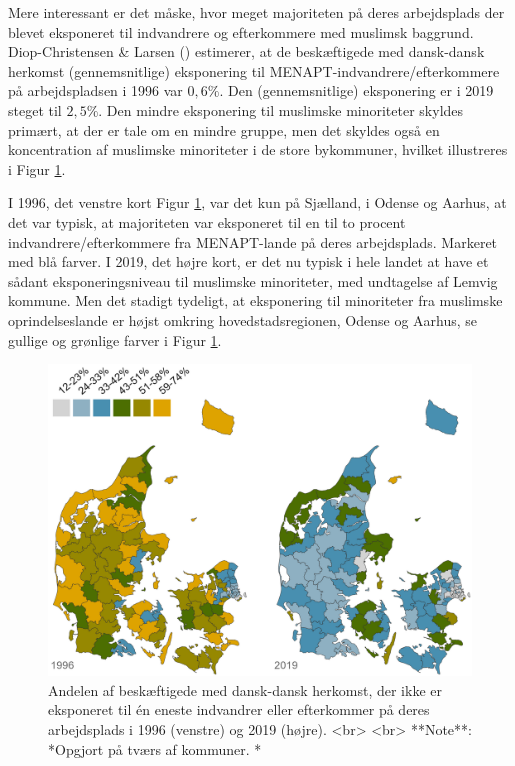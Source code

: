 \documentclass[
]{book}
\begin{document}
Mere interessant er det måske, hvor meget majoriteten på deres arbejdsplads der blevet eksponeret til indvandrere og efterkommere med muslimsk baggrund. Diop-Christensen \& Larsen () estimerer, at de beskæftigede med dansk-dansk herkomst (gennemsnitlige) eksponering til MENAPT-indvandrere/efterkommere på arbejdspladsen i 1996 var \(0,6\%\). Den (gennemsnitlige) eksponering er i 2019 steget til \(2,5\%\). Den mindre eksponering til muslimske minoriteter skyldes primært, at der er tale om en mindre gruppe, men det skyldes også en koncentration af muslimske minoriteter i de store bykommuner, hvilket illustreres i Figur \ref{fig:fig-5-3}.

I 1996, det venstre kort Figur \ref{fig:fig-5-3}, var det kun på Sjælland, i Odense og Aarhus, at det var typisk, at majoriteten var eksponeret til en til to procent indvandrere/efterkommere fra MENAPT-lande på deres arbejdsplads. Markeret med blå farver. I 2019, det højre kort, er det nu typisk i hele landet at have et sådant eksponeringsniveau til muslimske minoriteter, med undtagelse af Lemvig kommune. Men det stadigt tydeligt, at eksponering til minoriteter fra muslimske oprindelseslande er højst omkring hovedstadsregionen, Odense og Aarhus, se gullige og grønlige farver i Figur \ref{fig:fig-5-3}.

\begin{figure}
\includegraphics[width=1\linewidth]{images/Figur_4_2} \caption{Andelen af beskæftigede med dansk-dansk herkomst, der ikke er eksponeret til én eneste indvandrer eller efterkommer på deres arbejdsplads i 1996 (venstre) og 2019 (højre). <br> <br> **Note**: *Opgjort på tværs af kommuner. *}\label{fig:fig-5-3}
\end{figure}
\end{document}
